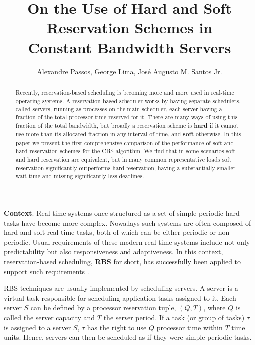 \documentclass[times, 10pt,twocolumn]{article}
\author{Alexandre Passos, George Lima, Jos\'e Augusto M. Santos Jr.}
\title{On the Use of Hard and Soft Reservation Schemes in \\ Constant Bandwidth Servers}
\begin{document}
\graphicspath{{figs/}{data/}}

\maketitle

\begin{abstract}

  Recently, reservation-based scheduling is becoming more and more
  used in real-time operating systems. A reservation-based scheduler
  works by having separate schedulers, called servers, running as
  processes on the main scheduler, each server having a fraction of
  the total processor time reserved for it. There are many ways of
  using this fraction of the total bandwidth, but broadly a
  reservation scheme is \textbf{hard} if it cannot use more than its
  allocated fraction in any interval of time, and \textbf{soft}
  otherwise. In this paper we present the first comprehensive
  comparison of the performance of soft and hard reservation schemes
  for the CBS algorithm. We find that in some scenarios soft and hard
  reservation are equivalent, but in many common representative loads
  soft reservation significantly outperforms hard reservation, having
  a substantially smaller wait time and missing significantly less
  deadlines.
  
\end{abstract}

\label{sec:introduction}

\textbf{Context}.  Real-time systems once structured as a set of
simple periodic hard tasks \cite{liu.ea73:scheduling} have become more
complex. Nowadays such systems are often composed of hard and soft
real-time tasks, both of which can be either periodic or non-periodic.
Usual requirements of these modern real-time systems include not only
predictability but also responsiveness and adaptiveness. In this
context, reservation-based scheduling, \textbf{RBS} for short, has
successfully been applied to support such requirements
\cite{abeni.ea04:resource,mercer.ea94:processor,rajkumar.ea98:resource,sprunt.ea89:aperiodic,steffens.ea03:resource}.

RBS techniques are usually implemented by scheduling servers. A server
is a virtual task responsible for scheduling application tasks
assigned to it.  Each server $S$ can be defined by a processor
reservation tuple, $(Q,T)$, where $Q$ is called the server
capacity and $T$ the server period.  If a task (or group of tasks)
$\tau$ is assigned to a server $S$, $\tau$ has the right to use
$Q$ processor time within $T$ time units. Hence, servers can then
be scheduled as if they were simple periodic tasks.
\end{document}
